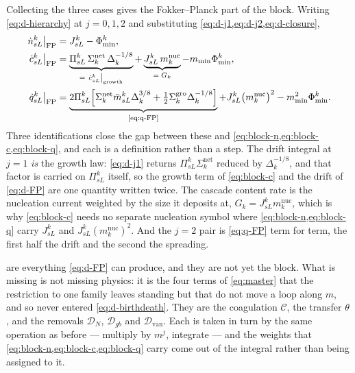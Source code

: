 Collecting the three cases gives the Fokker--Planck part of the block. Writing
\cref{eq:d-hierarchy} at $j=0,1,2$ and substituting
\cref{eq:d-j1,eq:d-j2,eq:d-closure},
\begin{align}
  \left.\dot n^k_{sL}\right|_{\mathrm{FP}}
    &= J^k_{sL} - \Phi^k_{\min},
  \label{eq:d-assemble-n}\\
  \left.\dot c^k_{sL}\right|_{\mathrm{FP}}
    &= \underbrace{\Pi^k_{sL}\,\Sigma^{\mathrm{net}}_k\,\Delta_k^{-1/8}}
       _{=\;\left.\dot c^k_{sL}\right|_{\mathrm{growth}}}
     + \underbrace{J^k_{sL}\,m^{\mathrm{nuc}}_k}_{=\;G_k}
     - m_{\min}\Phi^k_{\min},
  \label{eq:d-assemble-c}\\
  \left.\dot q^k_{sL}\right|_{\mathrm{FP}}
    &= \underbrace{2\Pi^k_{sL}\Bigl[\Sigma^{\mathrm{net}}_k\bar m^k_{sL}
         \Delta_k^{3/8}+\tfrac12\Sigma^{\mathrm{gro}}_k\Delta_k^{-1/8}\Bigr]}
       _{\text{\cref{eq:q-FP}}}
     + J^k_{sL}\bigl(m^{\mathrm{nuc}}_k\bigr)^{2}
     - m_{\min}^{2}\Phi^k_{\min}.
  \label{eq:d-assemble-q}
\end{align}
Three identifications close the gap between these and
\cref{eq:block-n,eq:block-c,eq:block-q}, and each is a definition rather than a
step. The drift integral at $j=1$ \emph{is} the growth law: \cref{eq:d-j1}
returns $\Pi^k_{sL}\Sigma^{\mathrm{net}}_k$ reduced by $\Delta_k^{-1/8}$, and
that factor is carried on $\Pi^k_{sL}$ itself, so the growth term of
\cref{eq:block-c} and the drift of \cref{eq:d-FP} are one quantity written
twice. The cascade content rate is the nucleation current weighted by the size
it deposits at, $G_k=J^k_{sL}m^{\mathrm{nuc}}_k$, which is why
\cref{eq:block-c} needs no separate nucleation symbol where
\cref{eq:block-n,eq:block-q} carry $J^k_{sL}$ and
$J^k_{sL}(m^{\mathrm{nuc}}_k)^{2}$. And the $j=2$ pair is \cref{eq:q-FP} term
for term, the first half the drift and the second the spreading.

 are everything
\cref{eq:d-FP} can produce, and they are not yet the block. What is missing is
not missing physics: it is the four terms of \cref{eq:master} that the
restriction to one family leaves standing but that do not move a loop along
$m$, and so never entered \cref{eq:d-birthdeath}. They are the coagulation
$\mathcal C$, the transfer $\theta$, and the removals $\mathcal D_{N}$,
$\mathcal D_{gb}$ and $\mathcal D_{\mathrm{van}}$. Each is taken in turn by the
same operation as before --- multiply by $m^{j}$, integrate --- and the weights
that \cref{eq:block-n,eq:block-c,eq:block-q} carry come out of the integral
rather than being assigned to it.

